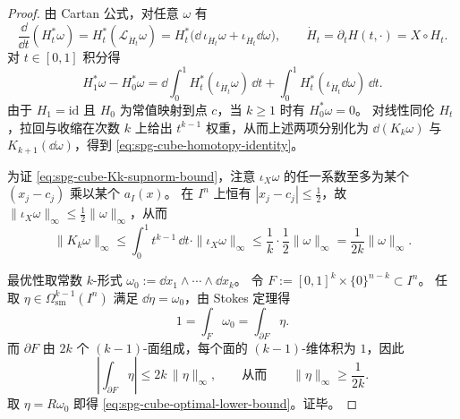 \begin{proof}
由 Cartan 公式，对任意 \(\omega\) 有
\[
\frac{\dd}{\dd t}(H_t^*\omega)=H_t^*(\mathcal{L}_{\dot H_t}\omega)
=H_t^*\bigl(\dd\,\iota_{\dot H_t}\omega+\iota_{\dot H_t}\dd\omega\bigr),
\qquad
\dot H_t=\partial_tH(t,\cdot)=X\circ H_t.
\]
对 \(t\in[0,1]\) 积分得
\[
H_1^*\omega-H_0^*\omega
=\dd\int_0^1 H_t^*(\iota_{\dot H_t}\omega)\,\dd t+\int_0^1 H_t^*(\iota_{\dot H_t}\dd\omega)\,\dd t.
\]
由于 \(H_1=\mathrm{id}\) 且 \(H_0\) 为常值映射到点 \(c\)，当 \(k\ge 1\) 时有 \(H_0^*\omega=0\)。
对线性同伦 \(H_t\)，拉回与收缩在次数 \(k\) 上给出 \(t^{k-1}\) 权重，从而上述两项分别化为 \(\dd(K_k\omega)\) 与 \(K_{k+1}(\dd\omega)\)，得到 \eqref{eq:spg-cube-homotopy-identity}。
\par
为证 \eqref{eq:spg-cube-Kk-supnorm-bound}，注意 \(\iota_X\omega\) 的任一系数至多为某个 \((x_j-c_j)\) 乘以某个 \(a_I(x)\)。
在 \(I^n\) 上恒有 \(|x_j-c_j|\le \tfrac12\)，故 \(\|\iota_X\omega\|_\infty\le \tfrac12\|\omega\|_\infty\)，从而
\[
\|K_k\omega\|_\infty
\le \int_0^1 t^{k-1}\,\dd t\cdot \|\iota_X\omega\|_\infty
\le \frac{1}{k}\cdot\frac12\|\omega\|_\infty
=\frac{1}{2k}\|\omega\|_\infty.
\]
\par
最优性取常数 \(k\)-形式 \(\omega_0:=\dd x_1\wedge\cdots\wedge \dd x_k\)。
令 \(F:=[0,1]^k\times\{0\}^{n-k}\subset I^n\)。
任取 \(\eta\in\Omega^{k-1}_{\mathrm{sm}}(I^n)\) 满足 \(\dd\eta=\omega_0\)，由 Stokes 定理得
\[
1=\int_F\omega_0=\int_{\partial F}\eta.
\]
而 \(\partial F\) 由 \(2k\) 个 \((k-1)\)-面组成，每个面的 \((k-1)\)-维体积为 \(1\)，因此
\[
\left|\int_{\partial F}\eta\right|
\le 2k\,\|\eta\|_\infty,
\qquad\text{从而}\qquad
\|\eta\|_\infty\ge \frac{1}{2k}.
\]
取 \(\eta=R\omega_0\) 即得 \eqref{eq:spg-cube-optimal-lower-bound}。证毕。
\end{proof}

